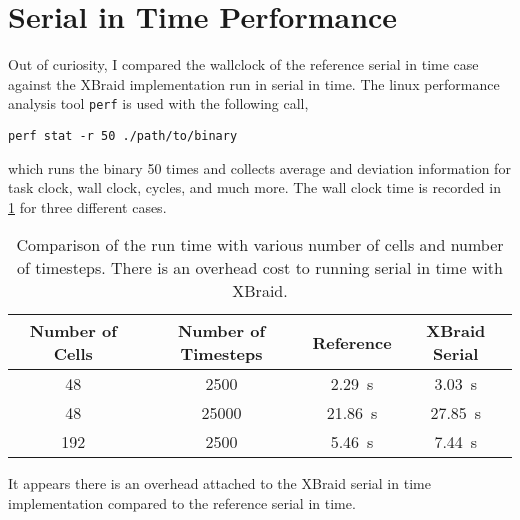 \documentclass{article}
\begin{document}
\section{Serial in Time Performance}
\label{sec:SiTPerformance}

Out of curiosity, I compared the wallclock of the reference serial in time case
against the XBraid implementation run in serial in time.
The linux performance analysis tool \texttt{perf} is used with the following
call,
\begin{verbatim}
perf stat -r 50 ./path/to/binary
\end{verbatim}
which runs the binary 50 times and collects average and deviation information
for task clock, wall clock, cycles, and much more.
The wall clock time is recorded in \ref{tbl:serialPerf} for three different cases.
\begin{table}\label{tbl:serialPerf}
  \centering
  \begin{tabular}{c | c | c | c}
    Number of Cells & Number of Timesteps & Reference & XBraid Serial \\
    \hline
    48 & 2500 & \SI{2.29}{\second} & \SI{3.03}{\second} \\
    48 & 25000 & \SI{21.86}{\second} & \SI{27.85}{\second} \\
    192 & 2500 & \SI{5.46}{\second} & \SI{7.44}{\second} \\
  \end{tabular}
  \caption{Comparison of the run time with various number of cells and number of
  timesteps. There is an overhead cost to running serial in time with XBraid.}
\end{table}

It appears there is an overhead attached to the XBraid serial in time implementation compared
to the reference serial in time.
\end{document}
